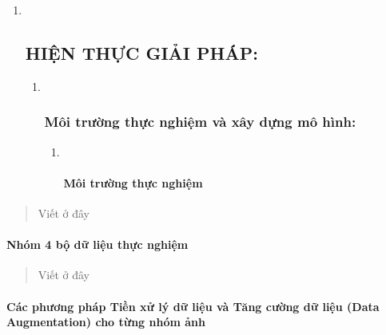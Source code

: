 \documentclass[
]{article}
\begin{document}
\begin{enumerate}
\def\labelenumi{\arabic{enumi}.}
\item ~
  \hypertarget{hiux1ec7n-thux1ef1c-giux1ea3i-phuxe1p}{%
  \subsection{HIỆN THỰC GIẢI
  PHÁP:}\label{hiux1ec7n-thux1ef1c-giux1ea3i-phuxe1p}}

  \begin{enumerate}
  \def\labelenumii{\arabic{enumii}.}
  \item ~
    \hypertarget{muxf4i-trux1b0ux1eddng-thux1ef1c-nghiux1ec7m-vuxe0-xuxe2y-dux1ef1ng-muxf4-huxecnh}{%
    \subsubsection{Môi trường thực nghiệm và xây dựng mô
    hình:}\label{muxf4i-trux1b0ux1eddng-thux1ef1c-nghiux1ec7m-vuxe0-xuxe2y-dux1ef1ng-muxf4-huxecnh}}

    \begin{enumerate}
    \def\labelenumiii{\arabic{enumiii}.}
    \item ~
      \hypertarget{muxf4i-trux1b0ux1eddng-thux1ef1c-nghiux1ec7m}{%
      \paragraph{Môi trường thực
      nghiệm}\label{muxf4i-trux1b0ux1eddng-thux1ef1c-nghiux1ec7m}}
    \end{enumerate}
  \end{enumerate}
\end{enumerate}

\begin{quote}
Viết ở đây
\end{quote}

\hypertarget{nhuxf3m-4-bux1ed9-dux1eef-liux1ec7u-thux1ef1c-nghiux1ec7m}{%
\paragraph{Nhóm 4 bộ dữ liệu thực
nghiệm}\label{nhuxf3m-4-bux1ed9-dux1eef-liux1ec7u-thux1ef1c-nghiux1ec7m}}

\begin{quote}
Viết ở đây
\end{quote}

\hypertarget{cuxe1c-phux1b0ux1a1ng-phuxe1p-tiux1ec1n-xux1eed-luxfd-dux1eef-liux1ec7u-vuxe0-tux103ng-cux1b0ux1eddng-dux1eef-liux1ec7u-data-augmentation-cho-tux1eebng-nhuxf3m-ux1ea3nh}{%
\paragraph{Các phương pháp Tiền xử lý dữ liệu và Tăng cường dữ liệu
(Data Augmentation) cho từng nhóm
ảnh}\label{cuxe1c-phux1b0ux1a1ng-phuxe1p-tiux1ec1n-xux1eed-luxfd-dux1eef-liux1ec7u-vuxe0-tux103ng-cux1b0ux1eddng-dux1eef-liux1ec7u-data-augmentation-cho-tux1eebng-nhuxf3m-ux1ea3nh}}
\end{document}
